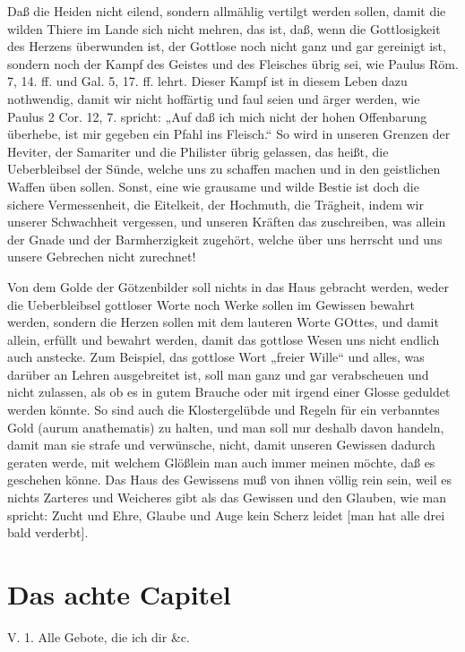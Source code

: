 Daß die Heiden nicht eilend, sondern allmählig vertilgt werden sollen, damit die wilden Thiere im Lande sich nicht mehren, das ist, daß, wenn die Gottlosigkeit des Herzens überwunden ist, der Gottlose noch nicht ganz und gar gereinigt ist, sondern noch der Kampf des Geistes und des Fleisches übrig sei, wie Paulus Röm. 7, 14. ff. und Gal. 5, 17. ff. lehrt. Dieser Kampf ist in diesem Leben dazu nothwendig, damit wir nicht hoffärtig und faul seien und ärger werden, wie Paulus 2 Cor. 12, 7. spricht: „Auf daß ich mich nicht der hohen Offenbarung überhebe, ist mir gegeben ein Pfahl ins Fleisch.“ So wird in unseren Grenzen der Heviter, der Samariter und die Philister übrig gelassen, das heißt, die Ueberbleibsel der Sünde, welche uns zu schaffen machen und in den geistlichen Waffen üben sollen. Sonst, eine wie grausame und wilde Bestie ist doch die sichere Vermessenheit, die Eitelkeit, der Hochmuth, die Trägheit, indem wir unserer Schwachheit vergessen, und unseren Kräften das zuschreiben, was allein der Gnade und der Barmherzigkeit zugehört, welche über uns herrscht und uns unsere Gebrechen nicht zurechnet!

Von dem Golde der Götzenbilder soll nichts
in das Haus gebracht werden, weder die Ueberbleibsel gottloser Worte noch Werke sollen im Gewissen bewahrt werden, sondern die Herzen sollen mit dem lauteren Worte GOttes, und damit allein, erfüllt und bewahrt werden, damit das gottlose Wesen uns nicht endlich auch anstecke. Zum Beispiel, das gottlose Wort „freier Wille“ und alles, was darüber an Lehren ausgebreitet ist, soll man ganz und gar verabscheuen und nicht zulassen, als ob es in gutem Brauche oder mit irgend einer Glosse geduldet werden könnte. So sind auch die Klostergelübde und Regeln für ein verbanntes Gold (aurum anathematis) zu halten, und man soll nur deshalb davon handeln, damit man sie strafe und verwünsche, nicht, damit unseren Gewissen dadurch geraten werde, mit welchem Glößlein man auch immer meinen möchte, daß es geschehen könne. Das Haus des Gewissens muß von ihnen völlig rein sein, weil es nichts Zarteres und Weicheres gibt als das Gewissen und den Glauben, wie man spricht: Zucht und Ehre, Glaube und Auge kein Scherz leidet [man hat alle drei bald verderbt].

\section{Das achte Capitel}

\begin{schriftzitat}
V. 1. Alle Gebote, die ich dir \&c.
\end{schriftzitat}

